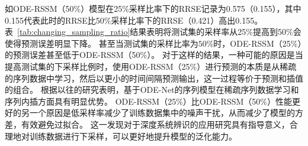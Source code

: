 如ODE-RSSM（50\%）模型在25\%采样比率下的RRSE记录为0.575（0.155），其中0.155代表此时的RRSE比50\%采样比率下的RRSE（0.421）高出0.155。
表~\ref{tab:changing_sampling_ratio}结果表明将测试集的采样率从25\%提高到50\%会使得预测误差明显下降。
甚至当测试集的采样比率为$50\%$时，ODE-RSSM（25\%）的预测误差甚至低于ODE-RSSM（50\%）。
对于这样的结果，一种可能的原因是当提高测试集的下采样比例时，使用ODE-RSSM（25\%）进行预测的本质是从稀疏的序列数据中学习，然后以更小的时间间隔预测输出，这一过程等价于预测和插值的组合。
根据以往的研究\cite{Yildiz2019}表明，基于ODE-Net的序列模型在稀疏序列数据学习和序列内插方面具有明显优势。
ODE-RSSM（25\%）比ODE-RSSM（50\%）性能更好的另一个原因是低采样率减少了训练数据集中的噪声干扰，从而减少了模型的方差，有效避免过拟合。
这一发现对于深度系统辨识的应用研究具有指导意义，合理地对训练数据进行下采样，可以更好地提升模型的泛化能力。

